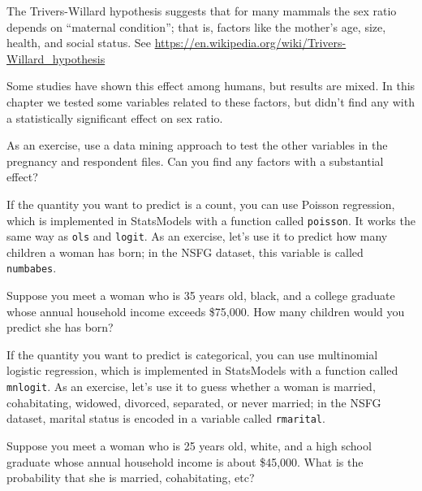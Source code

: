 \documentclass[12pt]{book}
\begin{document}
\begin{exercise}
The Trivers-Willard hypothesis suggests that for many mammals the
sex ratio depends on ``maternal condition''; that is,
factors like the mother's age, size, health, and social status.
See \url{https://en.wikipedia.org/wiki/Trivers-Willard_hypothesis}

Some studies have shown this effect among humans, but results are
mixed.  In this chapter we tested some variables related to these
factors, but didn't find any with a statistically significant effect
on sex ratio.
   

As an exercise, use a data mining approach to test the other variables
in the pregnancy and respondent files.  Can you find any factors with
a substantial effect?  

\end{exercise}


\begin{exercise}
If the quantity you want to predict is a count, you can use Poisson
regression, which is implemented in StatsModels with a function called
{\tt poisson}.  It works the same way as {\tt ols} and {\tt logit}.
As an exercise, let's use it to predict how many children a woman
has born; in the NSFG dataset, this variable is called {\tt numbabes}.

Suppose you meet a woman who is 35 years old, black, and a college
graduate whose annual household income exceeds \$75,000.  How many
children would you predict she has born?
\end{exercise}


\begin{exercise}
If the quantity you want to predict is categorical, you can use
multinomial logistic regression, which is implemented in StatsModels
with a function called {\tt mnlogit}.  As an exercise, let's use it to
guess whether a woman is married, cohabitating, widowed, divorced,
separated, or never married; in the NSFG dataset, marital status is
encoded in a variable called {\tt rmarital}.

Suppose you meet a woman who is 25 years old, white, and a high
school graduate whose annual household income is about \$45,000.
What is the probability that she is married, cohabitating, etc?
\end{exercise}
\end{document}
